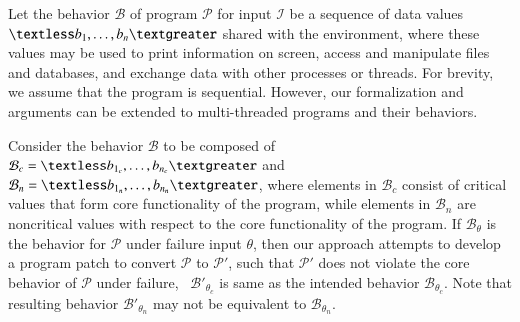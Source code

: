 Let the behavior $\mathcal{B}$ of program $\mathcal{P}$ for input $\mathcal{I}$
be a sequence of data values $\textless b_1, \ldots, b_n \textgreater$ shared
with the environment, where these values may be used to print information on
screen, access and manipulate files and databases, and exchange data with other
processes or threads. For brevity, we assume that the program is sequential.
However, our formalization and arguments can be extended to multi-threaded
programs and their behaviors.

Consider the behavior $\mathcal{B}$ to be composed of $\mathcal{B}_c = \textless
b_{1_c}, \ldots, b_{n_c} \textgreater$ and $\mathcal{B}_n = \textless b_{1_n},
\ldots, b_{n_n} \textgreater$, where elements in $\mathcal{B}_c$ consist of
critical values that form core functionality of the program, while elements in
$\mathcal{B}_n$ are noncritical values with respect to the core functionality of
the program.
%  
% 
%  
% 
If $\mathcal{B}_{\theta}$ is the behavior for $\mathcal{P}$ under failure input
$\theta$, then our approach attempts to
develop a program patch to convert $\mathcal{P}$ to $\mathcal{P}'$,
such that 
 $\mathcal{P}'$ does not violate the core behavior of $\mathcal{P}$ under
failure, \ie\ $\mathcal{B}'_{\theta_c}$ is same as the intended behavior
$\mathcal{B}_{\theta_c}$.
Note that resulting behavior $\mathcal{B}'_{\theta_n}$ may not be
equivalent to $\mathcal{B}_{\theta_n}$.

